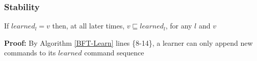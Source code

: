 \subsubsection{Stability}
\begin{theorem}
If $learned_l = v$ then, at all later times, $v \sqsubseteq learned_l$, for any $l$ and $v$ \par \label{S-T1}
\end{theorem} 
\textbf{Proof:} By Algorithm \ref{BFT-Learn} lines \{8-14\}, a learner can only append new commands to its $learned$ command sequence

